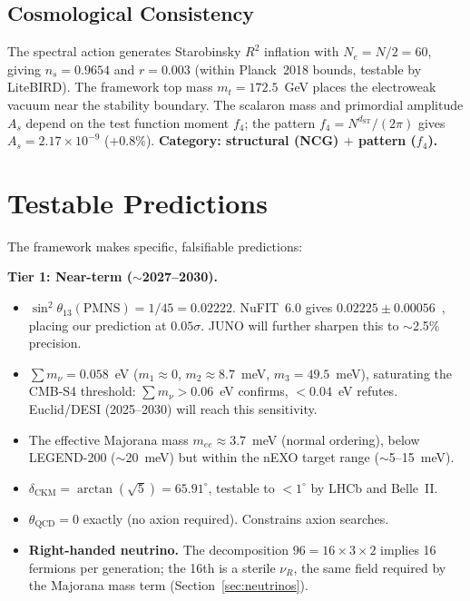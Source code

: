 \documentclass[12pt,a4paper]{article}
\theoremstyle{definition}
\begin{document}
\subsection{Cosmological Consistency}
\label{sec:cosmo}

The spectral action generates Starobinsky $R^2$ inflation with $N_e = N/2 = 60$, giving $n_s = 0.9654$ and $r = 0.003$ (within Planck~2018 bounds, testable by LiteBIRD).  The framework top mass $m_t = 172.5$~GeV places the electroweak vacuum near the stability boundary.  The scalaron mass and primordial amplitude $A_s$ depend on the test function moment $f_4$; the pattern $f_4 = N^{d_{\text{ST}}}/(2\pi)$ gives $A_s = 2.17 \times 10^{-9}$ ($+0.8\%$).  \textbf{Category: structural (NCG) $+$ pattern ($f_4$).}



\section{Testable Predictions}
\label{sec:predictions}

The framework makes specific, falsifiable predictions:

\textbf{Tier 1: Near-term ($\sim$2027--2030).}
\begin{itemize}
\item $\sin^2\theta_{13}(\text{PMNS}) = 1/45 = 0.02222$. NuFIT~6.0 gives $0.02225 \pm 0.00056$~\cite{nufit6}, placing our prediction at $0.05\sigma$. JUNO will further sharpen this to $\sim$2.5\% precision.
\item $\sum m_\nu = 0.058$~eV ($m_1 \approx 0$, $m_2 \approx 8.7$~meV, $m_3 = 49.5$~meV), saturating the CMB-S4 threshold: $\sum m_\nu > 0.06$~eV confirms, $< 0.04$~eV refutes.  Euclid/DESI (2025--2030) will reach this sensitivity.
\item The effective Majorana mass $m_{ee} \approx 3.7$~meV (normal ordering), below LEGEND-200 ($\sim$20~meV) but within the nEXO target range ($\sim$5--15~meV).
\item $\delta_{\text{CKM}} = \arctan(\sqrt{5}) = 65.91^\circ$, testable to $< 1^\circ$ by LHCb and Belle~II.
\item $\theta_{\text{QCD}} = 0$ exactly (no axion required). Constrains axion searches.
\item \textbf{Right-handed neutrino.} The decomposition $96 = 16 \times 3 \times 2$ implies 16 fermions per generation; the 16th is a sterile $\nu_R$, the same field required by the Majorana mass term (Section~\ref{sec:neutrinos}).
\end{itemize}
\end{document}
